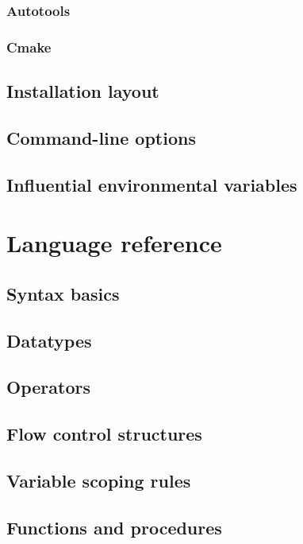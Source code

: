 \documentclass[10pt,titleauthor,openany]{mwbk}
\begin{document}
  \subsection{Autotools}
  
  \subsection{Cmake}
  
  \section{Installation layout}
  \section{Command-line options}
  \section{Influential environmental variables}

  \chapter{Language reference}
  \section{Syntax basics}
  
  \section{Datatypes}
  
  \section{Operators}
  
  \section{Flow control structures}
  
  \section{Variable scoping rules}
  
  \section{Functions and procedures}
  
\end{document}
